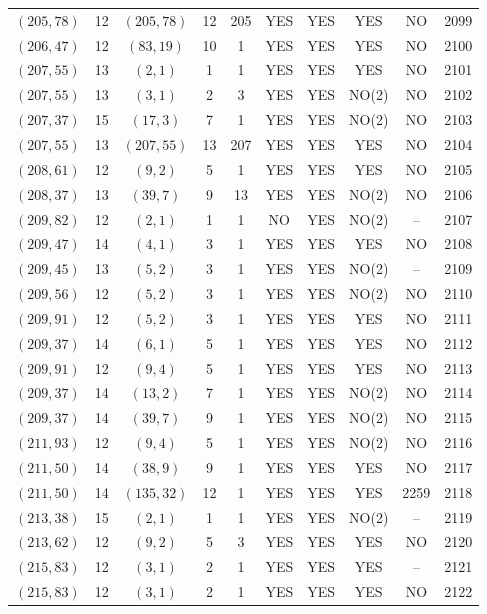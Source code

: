 \begin{longtable}{|c|c|c|c|c|c|c|c|c|c|}
$(205, 78)$ & 12 & $(205, 78)$ & 12 & 205 & YES & YES & YES & NO & 2099\\
$(206, 47)$ & 12 & $(83, 19)$ & 10 & 1 & YES & YES & YES & NO & 2100\\
$(207, 55)$ & 13 & $(2, 1)$ & 1 & 1 & YES & YES & YES & NO & 2101\\
$(207, 55)$ & 13 & $(3, 1)$ & 2 & 3 & YES & YES & NO(2) & NO & 2102\\
$(207, 37)$ & 15 & $(17, 3)$ & 7 & 1 & YES & YES & NO(2) & NO & 2103\\
$(207, 55)$ & 13 & $(207, 55)$ & 13 & 207 & YES & YES & YES & NO & 2104\\
$(208, 61)$ & 12 & $(9, 2)$ & 5 & 1 & YES & YES & YES & NO & 2105\\
$(208, 37)$ & 13 & $(39, 7)$ & 9 & 13 & YES & YES & NO(2) & NO & 2106\\
$(209, 82)$ & 12 & $(2, 1)$ & 1 & 1 & NO & YES & NO(2) & -- & 2107\\
$(209, 47)$ & 14 & $(4, 1)$ & 3 & 1 & YES & YES & YES & NO & 2108\\
$(209, 45)$ & 13 & $(5, 2)$ & 3 & 1 & YES & YES & NO(2) & -- & 2109\\
$(209, 56)$ & 12 & $(5, 2)$ & 3 & 1 & YES & YES & NO(2) & NO & 2110\\
$(209, 91)$ & 12 & $(5, 2)$ & 3 & 1 & YES & YES & YES & NO & 2111\\
$(209, 37)$ & 14 & $(6, 1)$ & 5 & 1 & YES & YES & YES & NO & 2112\\
$(209, 91)$ & 12 & $(9, 4)$ & 5 & 1 & YES & YES & YES & NO & 2113\\
$(209, 37)$ & 14 & $(13, 2)$ & 7 & 1 & YES & YES & NO(2) & NO & 2114\\
$(209, 37)$ & 14 & $(39, 7)$ & 9 & 1 & YES & YES & NO(2) & NO & 2115\\
$(211, 93)$ & 12 & $(9, 4)$ & 5 & 1 & YES & YES & NO(2) & NO & 2116\\
$(211, 50)$ & 14 & $(38, 9)$ & 9 & 1 & YES & YES & YES & NO & 2117\\
$(211, 50)$ & 14 & $(135, 32)$ & 12 & 1 & YES & YES & YES & 2259 & 2118\\
$(213, 38)$ & 15 & $(2, 1)$ & 1 & 1 & YES & YES & NO(2) & -- & 2119\\
$(213, 62)$ & 12 & $(9, 2)$ & 5 & 3 & YES & YES & YES & NO & 2120\\
$(215, 83)$ & 12 & $(3, 1)$ & 2 & 1 & YES & YES & YES & -- & 2121\\
$(215, 83)$ & 12 & $(3, 1)$ & 2 & 1 & YES & YES & YES & NO & 2122\\

\end{longtable}
